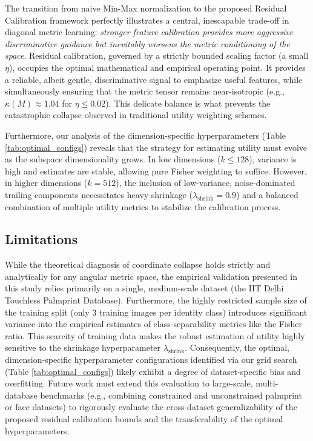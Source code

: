 \documentclass[conference]{IEEEtran}
\begin{document}
The transition from naive Min-Max normalization to the proposed Residual Calibration framework perfectly illustrates a central, inescapable trade-off in diagonal metric learning: \textit{stronger feature calibration provides more aggressive discriminative guidance but inevitably worsens the metric conditioning of the space}. Residual calibration, governed by a strictly bounded scaling factor (a small $\eta$), occupies the optimal mathematical and empirical operating point. It provides a reliable, albeit gentle, discriminative signal to emphasize useful features, while simultaneously ensuring that the metric tensor remains near-isotropic (e.g., $\kappa(M) \approx 1.04$ for $\eta \leq 0.02$). This delicate balance is what prevents the catastrophic collapse observed in traditional utility weighting schemes.

Furthermore, our analysis of the dimension-specific hyperparameters (Table \ref{tab:optimal_configs}) reveals that the strategy for estimating utility must evolve as the subspace dimensionality grows. In low dimensions ($k \leq 128$), variance is high and estimates are stable, allowing pure Fisher weighting to suffice. However, in higher dimensions ($k = 512$), the inclusion of low-variance, noise-dominated trailing components necessitates heavy shrinkage ($\lambda_{\text{shrink}} = 0.9$) and a balanced combination of multiple utility metrics to stabilize the calibration process.

\subsection{Limitations}
While the theoretical diagnosis of coordinate collapse holds strictly and analytically for any angular metric space, the empirical validation presented in this study relies primarily on a single, medium-scale dataset (the IIT Delhi Touchless Palmprint Database). Furthermore, the highly restricted sample size of the training split (only $3$ training images per identity class) introduces significant variance into the empirical estimates of class-separability metrics like the Fisher ratio. This scarcity of training data makes the robust estimation of utility highly sensitive to the shrinkage hyperparameter $\lambda_{\text{shrink}}$. Consequently, the optimal, dimension-specific hyperparameter configurations identified via our grid search (Table \ref{tab:optimal_configs}) likely exhibit a degree of dataset-specific bias and overfitting. Future work must extend this evaluation to large-scale, multi-database benchmarks (e.g., combining constrained and unconstrained palmprint or face datasets) to rigorously evaluate the cross-dataset generalizability of the proposed residual calibration bounds and the transferability of the optimal hyperparameters.
\end{document}
